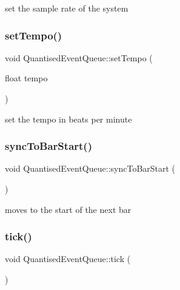 set the sample rate of the system 

\mbox{\label{classQuantisedEventQueue_aa779e58dd906e9d2ddee9187296fca80}} 
\subsubsection{\texorpdfstring{set\+Tempo()}{setTempo()}}
{\footnotesize\ttfamily void Quantised\+Event\+Queue\+::set\+Tempo (\begin{DoxyParamCaption}\item[{float}]{tempo }\end{DoxyParamCaption})}



set the tempo in beats per minute 

\mbox{\label{classQuantisedEventQueue_ab14d954f402e83c2aaed7ff38a73ac47}} 
\subsubsection{\texorpdfstring{sync\+To\+Bar\+Start()}{syncToBarStart()}}
{\footnotesize\ttfamily void Quantised\+Event\+Queue\+::sync\+To\+Bar\+Start (\begin{DoxyParamCaption}{ }\end{DoxyParamCaption})}



moves to the start of the next bar 

\mbox{\label{classQuantisedEventQueue_a97055bead1291aef1d540640fcb61bf9}} 
\subsubsection{\texorpdfstring{tick()}{tick()}}
{\footnotesize\ttfamily void Quantised\+Event\+Queue\+::tick (\begin{DoxyParamCaption}{ }\end{DoxyParamCaption})}



